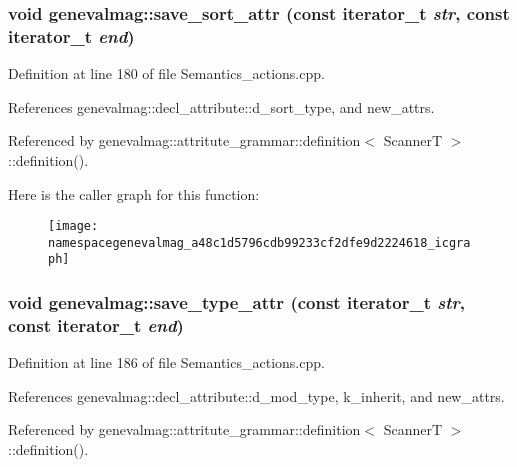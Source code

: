 \hypertarget{namespacegenevalmag_a48c1d5796cdb99233cf2dfe9d2224618}{
\subsubsection[{save\_\-sort\_\-attr}]{\setlength{\rightskip}{0pt plus 5cm}void genevalmag::save\_\-sort\_\-attr (const iterator\_\-t {\em str}, \/  const iterator\_\-t {\em end})}}
\label{namespacegenevalmag_a48c1d5796cdb99233cf2dfe9d2224618}


Definition at line 180 of file Semantics\_\-actions.cpp.



References genevalmag::decl\_\-attribute::d\_\-sort\_\-type, and new\_\-attrs.



Referenced by genevalmag::attritute\_\-grammar::definition$<$ ScannerT $>$::definition().



Here is the caller graph for this function:\nopagebreak
\begin{figure}[H]
\begin{center}
\leavevmode
\texttt{[image: namespacegenevalmag\_a48c1d5796cdb99233cf2dfe9d2224618\_icgraph]}
\end{center}
\end{figure}


\hypertarget{namespacegenevalmag_a9669d56acdb87bd7130c7da9d810b53a}{
\subsubsection[{save\_\-type\_\-attr}]{\setlength{\rightskip}{0pt plus 5cm}void genevalmag::save\_\-type\_\-attr (const iterator\_\-t {\em str}, \/  const iterator\_\-t {\em end})}}
\label{namespacegenevalmag_a9669d56acdb87bd7130c7da9d810b53a}


Definition at line 186 of file Semantics\_\-actions.cpp.



References genevalmag::decl\_\-attribute::d\_\-mod\_\-type, k\_\-inherit, and new\_\-attrs.



Referenced by genevalmag::attritute\_\-grammar::definition$<$ ScannerT $>$::definition().



